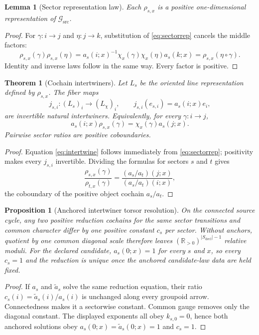 \documentclass[11pt]{article}
\newtheorem{theorem}{Theorem}
\newtheorem{lemma}{Lemma}
\newtheorem{proposition}{Proposition}
\newcommand{\R}{\mathbb{R}}
\newcommand{\Gsrc}{\mathcal{G}_{\mathrm{src}}}
\newcommand{\Lchi}{L_{\chi}}
\begin{document}
\begin{lemma}[Sector representation law]
Each $\rho_{s,x}$ is a positive one-dimensional representation of $\Gsrc$.
\end{lemma}

\begin{proof}
For $\gamma:i\to j$ and $\eta:j\to k$, substitution of
\eqref{eq:sectorrep} cancels the middle factors:
\[
\rho_{s,x}(\gamma)\rho_{s,x}(\eta)
=a_s(i;x)^{-1}\chi_x(\gamma)\chi_x(\eta)a_s(k;x)
=\rho_{s,x}(\eta\circ\gamma).
\]
Identity and inverse laws follow in the same way.  Every factor is positive.
\end{proof}

\begin{theorem}[Cochain intertwiners]
\label{thm:intertwiner}
Let $L_s$ be the oriented line representation defined by $\rho_{s,x}$.  The
fiber maps
\[
j_{s,i}:(L_s)_i\longrightarrow (\Lchi)_i,
\qquad j_{s,i}(e_{s,i})=a_s(i;x)e_i,
\]
are invertible natural intertwiners.  Equivalently, for every
$\gamma:i\to j$,
\begin{equation}
a_s(i;x)\rho_{s,x}(\gamma)=\chi_x(\gamma)a_s(j;x).
\label{eq:intertwine}
\end{equation}
Pairwise sector ratios are positive coboundaries.
\end{theorem}

\begin{proof}
Equation \eqref{eq:intertwine} follows immediately from
\eqref{eq:sectorrep}; positivity makes every $j_{s,i}$ invertible.  Dividing
the formulas for sectors $s$ and $t$ gives
\[
\frac{\rho_{s,x}(\gamma)}{\rho_{t,x}(\gamma)}
=\frac{(a_s/a_t)(j;x)}{(a_s/a_t)(i;x)},
\]
the coboundary of the positive object cochain $a_s/a_t$.
\end{proof}

\begin{proposition}[Anchored intertwiner torsor resolution]
\label{prop:anchor}
On the connected source cycle, any two positive reduction cochains for the
same sector transitions and common character differ by one positive constant
$c_s$ per sector.  Without anchors, quotient by one common diagonal scale
therefore leaves $(\R_{>0})^{|S_{\mathrm{decl}}|-1}$ relative moduli.  For the
declared candidate, $a_s(0;x)=1$ for every $s$ and $x$, so every $c_s=1$ and
the reduction is unique once the anchored candidate-law data are held fixed.
\end{proposition}

\begin{proof}
If $a_s$ and $\widetilde a_s$ solve the same reduction equation, their ratio
$c_s(i)=\widetilde a_s(i)/a_s(i)$ is unchanged along every groupoid arrow.
Connectedness makes it a sectorwise constant.  Common gauge removes only the
diagonal constant.  The displayed exponents all obey $k_{s,0}=0$, hence both
anchored solutions obey $a_s(0;x)=\widetilde a_s(0;x)=1$ and $c_s=1$.
\end{proof}
\end{document}
